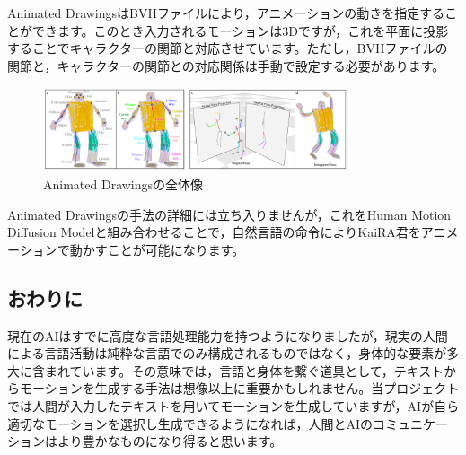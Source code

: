 Animated DrawingsはBVHファイルにより，アニメーションの動きを指定することができます。このとき入力されるモーションは3Dですが，これを平面に投影することでキャラクターの関節と対応させています。ただし，BVHファイルの関節と，キャラクターの関節との対応関係は手動で設定する必要があります。

\begin{figure}[htbp]
    \centering
    \includegraphics[width=0.8\textwidth]{moving-kaira-kun/fig/animated_drawings.png}
    \caption{Animated Drawingsの全体像}
    \label{fig:animated_drawings}
\end{figure}

Animated Drawingsの手法の詳細には立ち入りませんが，これをHuman Motion Diffusion Modelと組み合わせることで，自然言語の命令によりKaiRA君をアニメーションで動かすことが可能になります。

\subsection{おわりに}

現在のAIはすでに高度な言語処理能力を持つようになりましたが，現実の人間による言語活動は純粋な言語でのみ構成されるものではなく，身体的な要素が多大に含まれています。その意味では，言語と身体を繋ぐ道具として，テキストからモーションを生成する手法は想像以上に重要かもしれません。当プロジェクトでは人間が入力したテキストを用いてモーションを生成していますが，AIが自ら適切なモーションを選択し生成できるようになれば，人間とAIのコミュニケーションはより豊かなものになり得ると思います。
